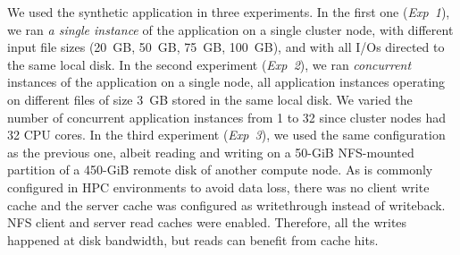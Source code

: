 \documentclass[conference]{IEEEtran}
\begin{document}
        We used the synthetic application in three experiments. In the
        first one (\textit{Exp~1}), we ran \emph{a single instance} of
        the application on a single cluster node, with different input file
        sizes (20~GB, 50~GB, 75~GB, 100~GB), and with all I/Os directed to
        the same local disk.
        In the second experiment (\textit{Exp~2}), we ran
        \emph{concurrent} instances of the application on a single node,
        all application instances operating on different files of size 3~GB
        stored in the same local disk. We varied the number of concurrent
        application instances from 1 to 32 since cluster nodes had 32 CPU
        cores.
        In the third experiment (\textit{Exp~3}), we used the same
        configuration as the previous one, albeit reading and writing
        on a 50-GiB NFS-mounted partition of a 450-GiB remote disk of
        another compute node. As is commonly configured in HPC
        environments to avoid data loss, there was no client write cache
        and the server cache was configured as writethrough instead of
        writeback. NFS client and server read caches were enabled. 
        Therefore, all the writes happened at disk bandwidth, but
        reads can benefit from cache hits.
\end{document}
